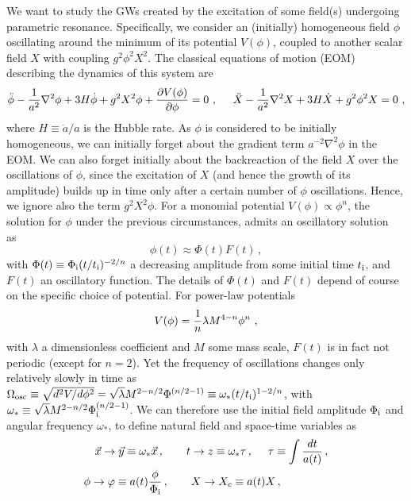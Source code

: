 \documentclass[a4paper,11pt]{article}
\newcommand{\be}{\begin{equation}}
\newcommand{\ee}{\end{equation}}
\begin{document}
We want to study the GWs created by the excitation of some field(s) undergoing parametric resonance. Specifically, we consider an (initially) homogeneous field $\phi$ oscillating around the minimum of its potential $V(\phi)$, coupled to another scalar field $X$ with coupling $g^2\phi^2 X^2$. The classical equations of motion (EOM) describing the dynamics of this system are
\be \ddot \phi - \frac{1}{a^2} \nabla^2\phi + 3 H \dot \phi + g^2  X^2 \phi  + \frac{\partial V(\phi)}{\partial \phi} = 0 \ , \hspace{0.5cm} \ddot X -  \frac{1}{a^2} \nabla^2 X + 3 H \dot X + g^2 \phi^2 X = 0  \label{eq:generic-eom} \ ,\ee
where $H \equiv {\dot{a}/a}$ is the Hubble rate. As $\phi$ is considered to be initially homogeneous, we can initially forget about the gradient term $a^{-2} \nabla^2\phi$ in the EOM. We can also forget initially about the backreaction of the field $X$ over the oscillations of $\phi$, since the excitation of $X$ (and hence the growth of its amplitude) builds up in time only after a certain number of $\phi$ oscillations. Hence, we ignore also the term $g^2  X^2 \phi$. For a monomial potential $V(\phi) \propto \phi^n$, the solution for $\phi$ under the previous circumstances, admits an oscillatory solution as~\cite{Turner:1983he} 
\begin{equation}\label{eq:ApproxVarPhi}
\phi(t) \approx \Phi(t)F(t)\,,
\end{equation}
with $\Phi(t) \equiv \Phi_{\rm i}(t/t_{\rm i})^{-2/n}$ a decreasing amplitude from some initial time $t_{\rm i}$, and $F(t)$ an oscillatory function. The details of $\Phi(t)$ and $F(t)$ depend of course on the specific choice of potential. For power-law potentials 
\be V(\phi) = {1\over n}\lambda M^{4-n}\phi^n \ , \label{eq:powerlaw-pot}\ee 
with $\lambda$ a dimensionless coefficient and $M$ some mass scale, $F(t)$ is in fact not periodic (except for $n = 2$). Yet the frequency of oscillations changes only relatively slowly in time as $\Omega_{\rm osc} \equiv \sqrt{d^2V/d\phi^2} = \sqrt{\lambda} M^{2-n/2}\Phi^{(n/2-1)} \equiv \omega_{*}(t/t_{\rm i})^{1-2/n}$, with $\omega_{*} \equiv \sqrt{\lambda} M^{2-n/2}\Phi_{\rm i}^{(n/2-1)}$. We can therefore use the initial field amplitude $\Phi_{\rm i}$ and angular frequency $\omega_{*}$, to define natural field and space-time variables as 
\begin{eqnarray}\label{eq:naturalVariables}
\vec{x} \rightarrow \vec{y} \equiv \omega_{*}\vec{x}\,,~~~~~~ t \rightarrow z \equiv \omega_{*}\tau\,,~~~~\tau \equiv \int {dt\over a(t)}\,,\\
\phi \rightarrow \varphi \equiv a(t){\phi\over\Phi_{\rm i}}\,,~~~~~~ X \rightarrow X_c \equiv a(t)X \,,\nonumber \hspace*{1.5cm}
\end{eqnarray}
\end{document}
